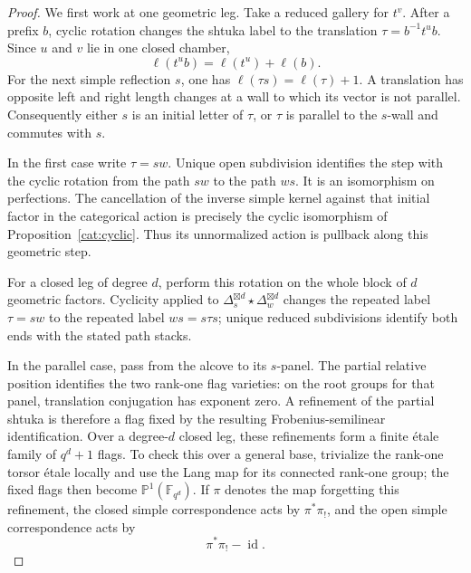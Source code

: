 \begin{proof}
We first work at one geometric leg.  Take a reduced gallery for $t^v$.
After a prefix $b$, cyclic rotation changes the shtuka label to the
translation $\tau=b^{-1}t^ub$.  Since $u$ and $v$ lie in one closed
chamber,
\[
 \ell(t^ub)=\ell(t^u)+\ell(b).
\]
For the next simple reflection $s$, one has
$\ell(\tau s)=\ell(\tau)+1$.  A translation has opposite left and right
length changes at a wall to which its vector is not parallel.
Consequently either $s$ is an initial letter of $\tau$, or $\tau$
is parallel to the $s$-wall and commutes with $s$.

In the first case write $\tau=sw$.  Unique open subdivision identifies
the step with the cyclic rotation from the path $sw$ to the path $ws$.
It is an isomorphism on perfections.  The cancellation of the inverse
simple kernel against that initial factor in the categorical action
is precisely the cyclic isomorphism of Proposition~\ref{cat:cyclic}.
Thus its unnormalized action is pullback along this geometric step.

For a closed leg of degree $d$, perform this rotation on the whole block
of $d$ geometric factors.  Cyclicity applied to
$\Delta_s^{\boxtimes d}\star\Delta_w^{\boxtimes d}$ changes the repeated
label $\tau=sw$ to the repeated label $ws=s\tau s$; unique reduced
subdivisions identify both ends with the stated path stacks.

In the parallel case, pass from the alcove to its $s$-panel.  The partial
relative position identifies the two rank-one flag varieties: on the
root groups for that panel, translation conjugation has exponent zero.
A refinement of the partial shtuka is therefore a flag fixed by the
resulting Frobenius-semilinear identification.  Over a degree-$d$ closed
leg, these refinements form a finite \'etale family of $q^d+1$ flags.
To check this over a general base, trivialize the rank-one torsor
\'etale locally and use the Lang map for its connected rank-one group;
the fixed flags then become $\mathbb P^1(\mathbb F_{q^d})$.
If $\pi$ denotes the map forgetting this refinement, the closed simple
correspondence acts by $\pi^*\pi_!$, and the open simple correspondence
acts by
\begin{equation}\label{rot:panel-action}
 \pi^*\pi_!-\operatorname{id}.
\end{equation}


\end{proof}
